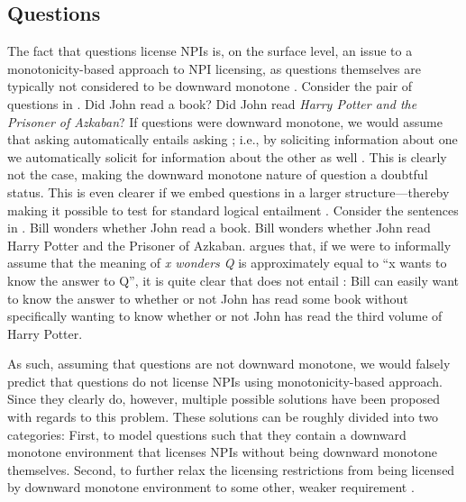 \subsection{Questions}
The fact that questions license NPIs is, on the surface level, an issue to a monotonicity-based approach to NPI licensing, as questions themselves are typically not considered to be downward monotone \parencite{vanRooij2003,Guerzoni2007}. Consider the pair of questions in .
\pex\label{ex:q-monotone}
\a Did John read a book?
\a Did John read \textit{Harry Potter and the Prisoner of Azkaban}?
\xe
If questions were downward monotone, we would assume that asking  automatically entails asking ; i.e., by soliciting information about one we automatically solicit for information about the other as well \parencite[p.~366f]{Guerzoni2007}. This is clearly not the case, making the downward monotone nature of question a doubtful status. This is even clearer if we embed questions in a larger structure---thereby making it possible to test for standard logical entailment \parencite[p.~367]{Guerzoni2007}. Consider the sentences in .
\pex\label{ex:embeddedq-monotone}
\a Bill wonders whether John read a book.\label{ex:embeddedq-monotone1}
\a Bill wonders whether John read Harry Potter and the Prisoner of Azkaban.\label{ex:embeddedq-monotone2}
\xe
\textcite[p.~367f]{Guerzoni2007} argues that, if we were to informally assume that the meaning of \textit{x wonders Q} is approximately equal to \enquote{x wants to know the answer to Q}, it is quite clear that  does not entail : Bill can easily want to know the answer to whether or not John has read some book without specifically wanting to know whether or not John has read the third volume of Harry Potter. 

As such, assuming that questions are not downward monotone, we would falsely predict that questions do not license NPIs using  monotonicity-based approach. Since they clearly do, however, multiple possible solutions have been proposed with regards to this problem. These solutions can be roughly divided into two categories: First, to model questions such that they contain a downward monotone environment that licenses NPIs without being downward monotone themselves. Second, to further relax the licensing restrictions from being licensed by downward monotone environment to some other, weaker requirement \parencite{Giannakidou1998}.

